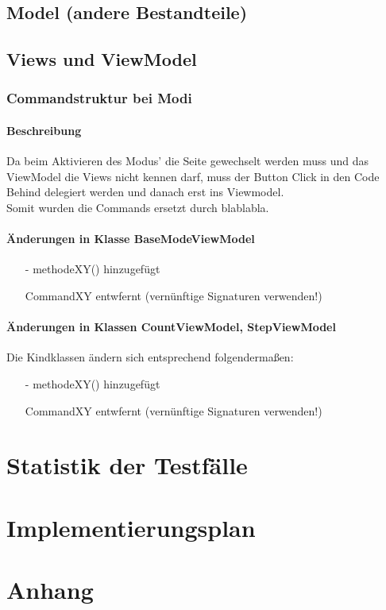 \documentclass[a4paper,12pt]{article}
\begin{document}
\subsection{Model (andere Bestandteile)}

\subsection{Views und ViewModel}
\subsubsection{Commandstruktur bei Modi}
\paragraph{Beschreibung}
Da beim Aktivieren des Modus' die Seite gewechselt werden muss und das ViewModel die Views nicht kennen darf, muss der Button Click in den Code Behind delegiert werden und danach erst ins Viewmodel.\\
Somit wurden die Commands ersetzt durch blablabla.
\paragraph{Änderungen in Klasse BaseModeViewModel}
\begin{itemize}
  \item[-] methodeXY() hinzugefügt
  \item[] CommandXY entwfernt (vernünftige Signaturen verwenden!)
\end{itemize}
\paragraph{Änderungen in Klassen CountViewModel, StepViewModel}
Die Kindklassen ändern sich entsprechend folgendermaßen:
\begin{itemize}
  \item[-] methodeXY() hinzugefügt
  \item[] CommandXY entwfernt (vernünftige Signaturen verwenden!)
\end{itemize}
\section{Statistik der Testfälle}

\section{Implementierungsplan}

\section{Anhang}




\printglossaries
{}
\end{document}
